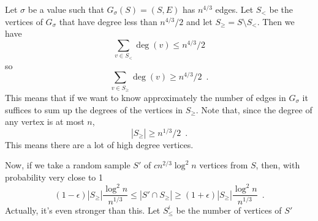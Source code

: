 \documentclass{article}
\begin{document}
Let $\sigma$ be a value such that $G_\sigma(S)=(S,E)$ has $n^{4/3}$ edges.
Let $S_<$ be the vertices of $G_\sigma$ that have degree less than
$n^{4/3}/2$ and let $S_\ge=S\setminus S_<$.  Then we have
\[
     \sum_{v\in S_<}\deg(v) \le n^{4/3}/2
\]
so
\[
     \sum_{v\in S_\ge}\deg(v) \ge n^{4/3}/2 \enspace .
\]
This means that if we want to know approximately the number of edges
in $G_\sigma$ it suffices to sum up the degrees of the vertices in
$S_\ge$.  Note that, since the degree of any vertex is at most $n$,
\[
        |S_\ge| \ge n^{1/3}/2 \enspace .
\]
This means there are a lot of high degree vertices.

Now, if we take a random sample $S'$ of $cn^{2/3}\log^2 n$ vertices from $S$,
then, with probability very close to 1
\[
      (1-\epsilon)|S_\ge|\frac{\log^2 n}{n^{1/3}} 
	\le |S'\cap S_\ge| 
	\ge (1+\epsilon)|S_\ge|\frac{\log^2 n}{n^{1/3}} \enspace .
\]
Actually, it's even stronger than this.  Let $S^{i}_\le$ be the number
of vertices of $S'$
\end{document}
